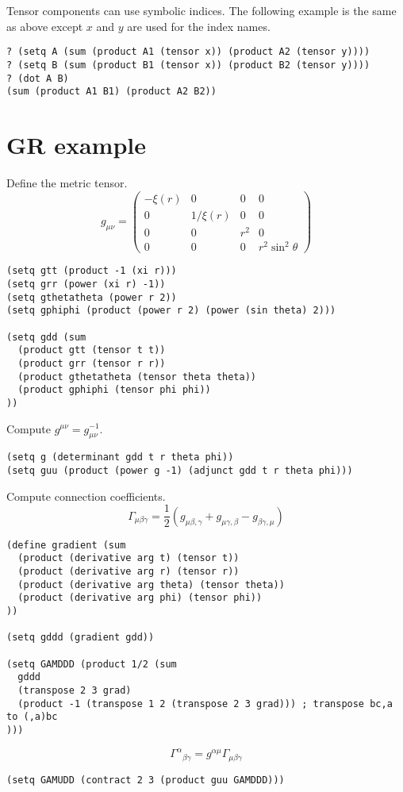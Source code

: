 \documentclass[12pt]{article}
\begin{document}
Tensor components can use symbolic indices.
The following example is the same as above except $x$ and $y$ are used for the index names.
\begin{verbatim}
? (setq A (sum (product A1 (tensor x)) (product A2 (tensor y))))
? (setq B (sum (product B1 (tensor x)) (product B2 (tensor y))))
? (dot A B)
(sum (product A1 B1) (product A2 B2))
\end{verbatim}

\section*{GR example}

Define the metric tensor.
\begin{equation*}
g_{\mu\nu}=\begin{pmatrix}
-\xi(r) & 0 & 0 & 0
\\
0 & 1/\xi(r) & 0 & 0
\\
0 & 0 & r^2 & 0
\\
0 & 0 & 0 & r^2\sin^2\theta
\end{pmatrix}
\end{equation*}
\begin{verbatim}
(setq gtt (product -1 (xi r)))
(setq grr (power (xi r) -1))
(setq gthetatheta (power r 2))
(setq gphiphi (product (power r 2) (power (sin theta) 2)))

(setq gdd (sum
  (product gtt (tensor t t))
  (product grr (tensor r r))
  (product gthetatheta (tensor theta theta))
  (product gphiphi (tensor phi phi))
))
\end{verbatim}

Compute $g^{\mu\nu}=g_{\mu\nu}^{-1}$.
\begin{verbatim}
(setq g (determinant gdd t r theta phi))
(setq guu (product (power g -1) (adjunct gdd t r theta phi)))
\end{verbatim}

Compute connection coefficients.
\begin{equation*}
\Gamma_{\mu\beta\gamma}=\frac{1}{2}
(g_{\mu\beta,\gamma}+g_{\mu\gamma,\beta}-g_{\beta\gamma,\mu})
\end{equation*}
%
\begin{verbatim}
(define gradient (sum
  (product (derivative arg t) (tensor t))
  (product (derivative arg r) (tensor r))
  (product (derivative arg theta) (tensor theta))
  (product (derivative arg phi) (tensor phi))
))

(setq gddd (gradient gdd))

(setq GAMDDD (product 1/2 (sum
  gddd
  (transpose 2 3 grad)
  (product -1 (transpose 1 2 (transpose 2 3 grad))) ; transpose bc,a to (,a)bc
)))
\end{verbatim}
%
\begin{equation*}
\Gamma^\alpha{}_{\beta\gamma}=g^{\alpha\mu}\Gamma_{\mu\beta\gamma}
\end{equation*}
%
\begin{verbatim}
(setq GAMUDD (contract 2 3 (product guu GAMDDD)))
\end{verbatim}
\end{document}
